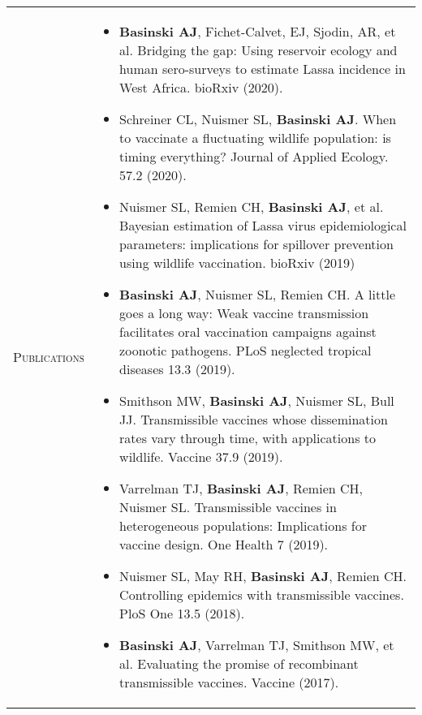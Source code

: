 \documentclass[11pt]{article}
\newcommand{\cellone}{2.5cm}
\newcommand{\celltwo}{12cm}
\begin{document}
\begin{tabularx}{\textwidth}{p{\cellone} p{\celltwo}}
  \parbox[t][0cm]{\cellone}{P\textsc{ublications}} &  \parbox[t][0cm]{12cm}{ 
    \begin{itemize}

    \item {\bf Basinski AJ}, Fichet-Calvet, EJ, Sjodin, AR, et al. Bridging the gap: Using reservoir ecology and human sero-surveys to estimate Lassa incidence in West Africa. bioRxiv (2020).

      \vspace{0.05in}      
      
    \item Schreiner CL, Nuismer SL, {\bf Basinski AJ}. When to vaccinate a fluctuating wildlife population: is timing everything? Journal of Applied Ecology. 57.2 (2020). 

      \vspace{0.05in}      
      
    \item Nuismer SL, Remien CH, {\bf Basinski AJ}, et al. Bayesian estimation of Lassa virus epidemiological parameters: implications for spillover prevention using wildlife vaccination. bioRxiv (2019)

      \vspace{0.05in}
      
    \item {\bf Basinski AJ}, Nuismer SL, Remien CH. A little goes a long way: Weak vaccine transmission facilitates oral vaccination campaigns against zoonotic pathogens. PLoS neglected tropical diseases 13.3 (2019).

      \vspace{0.05in}

      \item Smithson MW, {\bf Basinski AJ}, Nuismer SL, Bull JJ. Transmissible vaccines whose dissemination rates vary through time, with applications to wildlife. Vaccine 37.9 (2019).
      
      \vspace{0.05in}

    \item Varrelman TJ, {\bf Basinski AJ}, Remien CH, Nuismer SL. Transmissible vaccines in heterogeneous populations: Implications for vaccine design. One Health 7 (2019).
      
      \vspace{0.05in}
      
    \item Nuismer SL, May RH, {\bf Basinski AJ}, Remien CH. Controlling epidemics with transmissible vaccines. PloS One 13.5 (2018).

      \vspace{0.05in}
     
    \item {\bf Basinski AJ}, Varrelman TJ, Smithson MW, et al. Evaluating the promise of recombinant transmissible vaccines. Vaccine (2017).
      
    \end{itemize}
  }
\end{tabularx}
\end{document}
